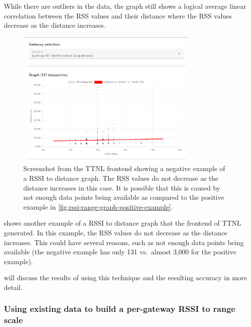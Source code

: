 While there are outliers in the data, the graph still shows a logical average linear correlation between the \ac{RSS} values and their distance where the \ac{RSS} values decrease as the distance increases.

\begin{figure}[htbp]
    \centering
    \includegraphics[width=0.8\textwidth]{pictures/ttn-locator/frontend/data/gateway_buehl_gw_rssi_range_graph.png}
    \caption{
        Screenshot from the \ac{TTNL} frontend showing a negative example of a \ac{RSSI} to distance graph.
        The \ac{RSS} values do not decrease as the distance increases in this case.
        It is possible that this is caused by not enough data points being available as compared to the positive example in \cref{fig:rssi-range-graph-positive-example}.
    }\label{fig:rssi-range-graph-negative-example}
\end{figure}

 shows another example of a \ac{RSSI} to distance graph that the frontend of \ac{TTNL} generated.
In this example, the \ac{RSS} values do not decrease as the distance increases.
This could have several reasons, such as not enough data points being available (the negative example has only 131 vs.\ almost 3,000 for the positive example).

 will discuss the results of using this technique and the resulting accuracy in more detail.

\subsubsection{Using existing data to build a per-gateway \acs{RSSI} to range scale}\label{subsubsec:per-gateway-rssi-to-range-scale}

